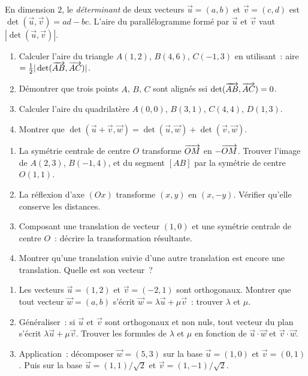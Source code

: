 \begin{challenge}
En dimension $2$, le \emph{d\'eterminant} de deux vecteurs
$\vec{u}=(a,b)$ et $\vec{v}=(c,d)$ est $\det(\vec{u},\vec{v})=ad-bc$.
L'aire du parall\'elogramme form\'e par $\vec{u}$ et $\vec{v}$
vaut $|\det(\vec{u},\vec{v})|$.
\begin{enumerate}
  \item Calculer l'aire du triangle $A(1,2)$, $B(4,6)$, $C(-1,3)$
        en utilisant~: aire $= \frac{1}{2}|\det(\overrightarrow{AB},\overrightarrow{AC})|$.
  \item D\'emontrer que trois points $A$, $B$, $C$ sont align\'es ssi
        $\det(\overrightarrow{AB},\overrightarrow{AC})=0$.
  \item Calculer l'aire du quadrilat\`ere $A(0,0)$, $B(3,1)$, $C(4,4)$, $D(1,3)$.
  \item Montrer que $\det(\vec{u}+\vec{v},\vec{w}) = \det(\vec{u},\vec{w})+\det(\vec{v},\vec{w})$.
\end{enumerate}
\end{challenge}

\begin{challenge}
\begin{enumerate}
  \item La sym\'etrie centrale de centre $O$ transforme $\overrightarrow{OM}$ en $-\overrightarrow{OM}$.
        Trouver l'image de $A(2,3)$, $B(-1,4)$, et du segment $[AB]$
        par la sym\'etrie de centre $O(1,1)$.
  \item La r\'eflexion d'axe $(Ox)$ transforme $(x,y)$ en $(x,-y)$.
        V\'erifier qu'elle conserve les distances.
  \item Composant une translation de vecteur $(1,0)$ et une sym\'etrie centrale
        de centre $O$~: d\'ecrire la transformation r\'esultante.
  \item Montrer qu'une translation suivie d'une autre translation est encore
        une translation. Quelle est son vecteur~?
\end{enumerate}
\end{challenge}

\begin{challenge}
\begin{enumerate}
  \item Les vecteurs $\vec{u}=(1,2)$ et $\vec{v}=(-2,1)$ sont orthogonaux.
        Montrer que tout vecteur $\vec{w}=(a,b)$ s'\'ecrit
        $\vec{w}=\lambda\vec{u}+\mu\vec{v}$~: trouver $\lambda$ et $\mu$.
  \item G\'en\'eraliser~: si $\vec{u}$ et $\vec{v}$ sont orthogonaux et non nuls,
        tout vecteur du plan s'\'ecrit $\lambda\vec{u}+\mu\vec{v}$.
        Trouver les formules de $\lambda$ et $\mu$ en fonction de
        $\vec{u}\cdot\vec{w}$ et $\vec{v}\cdot\vec{w}$.
  \item Application~: d\'ecomposer $\vec{w}=(5,3)$ sur la base $\vec{u}=(1,0)$
        et $\vec{v}=(0,1)$. Puis sur la base $\vec{u}=(1,1)/\sqrt{2}$
        et $\vec{v}=(1,-1)/\sqrt{2}$.
\end{enumerate}
\end{challenge}


